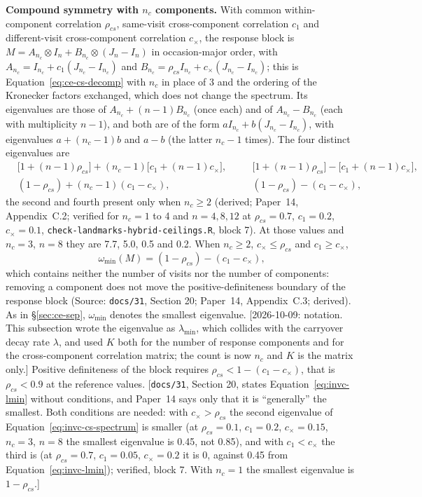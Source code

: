 \documentclass[11pt]{article}
\newcommand{\note}[1]{\textcolor{blue!60!black}{\small [#1]}}
\newcommand{\code}[1]{\texttt{#1}}
\begin{document}
\textbf{Compound symmetry with $n_c$ components.} With common
within-component correlation $\rho_{cs}$, same-visit cross-component
correlation $c_1$ and different-visit cross-component correlation
$c_\times$, the response block is
$M = A_{n_c} \otimes I_n + B_{n_c} \otimes (J_n - I_n)$ in occasion-major
order, with $A_{n_c} = I_{n_c} + c_1(J_{n_c} - I_{n_c})$ and
$B_{n_c} = \rho_{cs} I_{n_c} + c_\times(J_{n_c} - I_{n_c})$; this is
Equation~\eqref{eq:ce-cs-decomp} with $n_c$ in place of 3 and the
ordering of the Kronecker factors exchanged, which does not change
the spectrum. Its eigenvalues are those of $A_{n_c} + (n-1)B_{n_c}$ (once
each) and of $A_{n_c} - B_{n_c}$ (each with multiplicity $n - 1$), and both
are of the form $a I_{n_c} + b(J_{n_c} - I_{n_c})$, with eigenvalues $a + (n_c-1)b$
and $a - b$ (the latter $n_c - 1$ times). The four distinct eigenvalues
are
\begin{equation}
\begin{aligned}
&\bigl[1 + (n-1)\rho_{cs}\bigr] + (n_c-1)\bigl[c_1 + (n-1)c_\times\bigr],
&\quad &\bigl[1 + (n-1)\rho_{cs}\bigr] - \bigl[c_1 + (n-1)c_\times\bigr],\\
&(1 - \rho_{cs}) + (n_c-1)(c_1 - c_\times),
&\quad &(1 - \rho_{cs}) - (c_1 - c_\times),
\end{aligned}
\label{eq:invc-cs-spectrum}
\end{equation}
the second and fourth present only when $n_c \ge 2$ (derived; Paper~14,
Appendix~C.2; verified for $n_c = 1$ to 4 and $n = 4, 8, 12$ at
$\rho_{cs} = 0.7$, $c_1 = 0.2$, $c_\times = 0.1$, \code{check-landmarks-hybrid-ceilings.R},
block 7). At those values and $n_c = 3$, $n = 8$ they are 7.7, 5.0, 0.5
and 0.2. When $n_c \ge 2$, $c_\times \le \rho_{cs}$ and $c_1 \ge c_\times$,
\begin{equation}
\omega_{\min}(M) = (1 - \rho_{cs}) - (c_1 - c_\times),
\label{eq:invc-lmin}
\end{equation}
which contains neither the number of visits nor the number of
components: removing a component does not move the positive-definiteness
boundary of the response block (Source: \code{docs/31}, Section 20;
Paper~14, Appendix~C.3; derived). As in \S\ref{sec:ce-sep},
$\omega_{\min}$ denotes the smallest eigenvalue. \note{2026-10-09:
notation. This subsection wrote the eigenvalue as $\lambda_{\min}$,
which collides with the carryover decay rate $\lambda$, and used $K$
both for the number of response components and for the
cross-component correlation matrix; the count is now $n_c$ and $K$ is
the matrix only.} Positive definiteness of the
block requires $\rho_{cs} < 1 - (c_1 - c_\times)$, that is $\rho_{cs} < 0.9$ at
the reference values. \note{\code{docs/31}, Section 20, states
Equation~\eqref{eq:invc-lmin} without conditions, and Paper~14 says
only that it is ``generally'' the smallest. Both conditions are needed:
with $c_\times > \rho_{cs}$ the second eigenvalue of
Equation~\eqref{eq:invc-cs-spectrum} is smaller (at $\rho_{cs} = 0.1$,
$c_1 = 0.2$, $c_\times = 0.15$, $n_c = 3$, $n = 8$ the smallest eigenvalue
is 0.45, not 0.85), and with $c_1 < c_\times$ the third is (at
$\rho_{cs} = 0.7$, $c_1 = 0.05$, $c_\times = 0.2$ it is 0, against 0.45 from
Equation~\eqref{eq:invc-lmin}); verified, block 7. With $n_c = 1$ the
smallest eigenvalue is $1 - \rho_{cs}$.}
\end{document}
